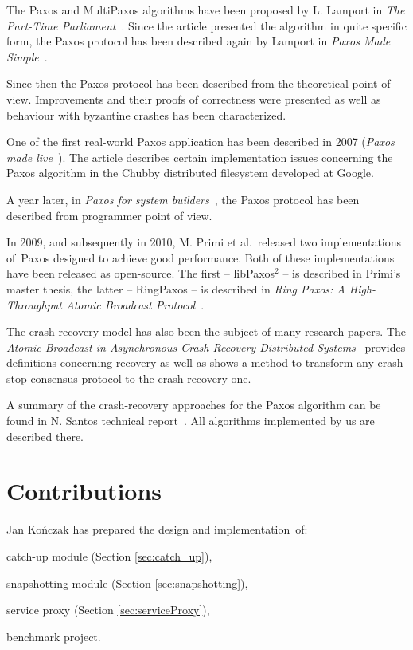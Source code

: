 The Paxos and MultiPaxos algorithms have been proposed by L. Lamport in \textit{The Part-Time Parliament}~\cite{Lam98}. Since the article presented the algorithm in quite specific form, the Paxos protocol has been described again by Lamport in \textit{Paxos Made Simple}~\cite{Lam01}.

Since then the Paxos protocol has been described from the theoretical point of view. Improvements and their proofs of correctness were presented as well as behaviour with byzantine crashes has been characterized.

One of the first real-world Paxos application has been described in 2007 (\textit{Paxos made live}~\cite{CGR07}). The article describes certain implementation issues concerning the Paxos algorithm in the Chubby distributed filesystem developed at Google.

A year later, in \textit{Paxos for system builders}~\cite{AK08}, the Paxos protocol has been described from programmer point of view.

In 2009, and subsequently in 2010, M. Primi et al.\ released two implementations of~Paxos designed to achieve good performance. Both of these implementations have been released as open-source. The first -- libPaxos$^2$ -- is described in Primi's master thesis, the latter -- RingPaxos -- is described in \textit{Ring Paxos: A High-Throughput Atomic Broadcast Protocol}~\cite{Mar10}.

The crash-recovery model has also been the subject of many research papers. \linebreak The \textit{Atomic Broadcast in Asynchronous Crash-Recovery Distributed Systems}~\cite{rodriguez2000atomic} provides definitions concerning recovery as well as shows a method to transform any crash-stop consensus protocol to the crash-recovery one.

A summary of the crash-recovery approaches for the Paxos algorithm can be found in N. Santos technical report~\cite{Nun10}. All algorithms implemented by us are described there.

\section{Contributions}

Jan Kończak has prepared the design and implementation~of:
\begin{tightList}
  \item[\textbullet] catch-up module (Section \ref{sec:catch_up}),
  \item[\textbullet] snapshotting module (Section \ref{sec:snapshotting}),
  \item[\textbullet] service proxy  (Section \ref{sec:serviceProxy}),
  \item[\textbullet] benchmark project.
\end{tightList}

